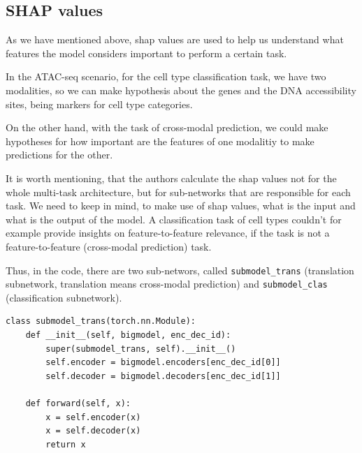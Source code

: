 \documentclass[12pt, a4paper]{article}
\begin{document}
\label{shap}
\subsection{SHAP values}

As we have mentioned above, shap values are used to help us understand what features the model considers important to perform a certain task.

In the ATAC-seq scenario, for the cell type classification task, we have two modalities, so we can make hypothesis about the genes and the DNA accessibility sites, being markers for cell type categories.

On the other hand, with the task of cross-modal prediction, we could make hypotheses for how important are the features of one modalitiy to make predictions for the other.

It is worth mentioning, that the authors calculate the shap values not for the whole multi-task architecture, but for sub-networks that are responsible for each task. We need to keep in mind, to make use of shap values, what is the input and what is the output of the model. A classification task of cell types couldn't for example provide insights on feature-to-feature relevance, if the task is not a feature-to-feature (cross-modal prediction) task.

Thus, in the code, there are two sub-networs, called \verb|submodel_trans| (translation subnetwork, translation means cross-modal prediction) and \verb|submodel_clas| (classification subnetwork).

\begin{verbatim}
class submodel_trans(torch.nn.Module):
    def __init__(self, bigmodel, enc_dec_id):
        super(submodel_trans, self).__init__()
        self.encoder = bigmodel.encoders[enc_dec_id[0]]
        self.decoder = bigmodel.decoders[enc_dec_id[1]]

    def forward(self, x):
        x = self.encoder(x)
        x = self.decoder(x)
        return x
\end{verbatim}
\end{document}

